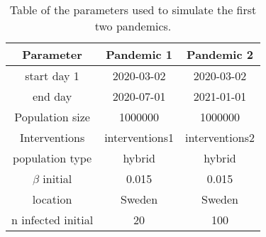 \begin{table}[htbp]
    \centering
    \caption{Table of the parameters used to simulate the first two pandemics.}
    \label{tab:parameters_covasim}
    \begin{tabular}{|c|c|c|}
        \hline
        \textbf{Parameter} & \textbf{Pandemic 1} & \textbf{ Pandemic 2} \\
        \hline
        start day 1 &2020-03-02 & 2020-03-02\\
        \hline

        end day  &2020-07-01 & 2021-01-01\\
        \hline

        Population size &1000000&1000000\\
        \hline

        Interventions & interventions1 & interventions2\\
        \hline

        population type& hybrid & hybrid\\

        \hline

        $\beta$ initial &0.015 & 0.015\\
        \hline

        location & Sweden & Sweden \\
        \hline

        n infected initial &20&100\\
        \hline
    \end{tabular}
\end{table}

